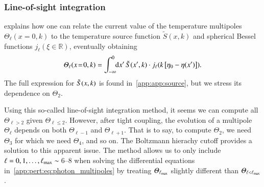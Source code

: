 \subsubsection{Line-of-sight integration}
    \citet{Callin2006} explains how one can relate the current value of the temperature multipoles $\Theta_\ell(x\!=\!0,k)$ to the temperature source function $\tilde{S}(x, k)$ and spherical Bessel functions $j_\ell(\xi\!\in\!\mathbb{R})$, eventually obtaining
    \begin{equation}\label{mil3:theo:eq:temp_multipole_and_source_func}
        \varTheta_\ell (x\!=\!0, k) = \int_{-\infty}^{0}\!\!\mathop{}\!\mathrm{d} {x'}\, \tilde{S}(x',k) \cdot j_\ell(k \left[\eta_0 - \eta(x')\right]).
    \end{equation}
    The full expression for $\tilde{S}(x, k)$ is found in~\cref{app:app:source}, but we stress its dependence on $\Theta_2$.

    Using this so-called line-of-sight integration method, it seems we can compute all $\Theta_{\ell>2}$ given $\Theta_{\ell\leq 2}$. However, after tight coupling, the evolution of a multipole $\Theta_\ell$ depends on both $\Theta_{\ell-1}$ and $\Theta_{\ell+1}$. That is to say, to compute $\Theta_2$, we need $\Theta_3$ for which we need $\Theta_4$, and so on. The Boltzmann hierachy cutoff provides a solution to this apparent issue. The method allows us to only include $\ell=0, 1, \dots, \ell_\mathrm{max}\sim$\,6--8 when solving the differential equations in~\cref{app:pert:eq:photon_multipoles} by treating $\varTheta_{\ell_\mathrm{max}}$ slightly different than $\varTheta_{\ell<\ell_\mathrm{max}}$. 
    




